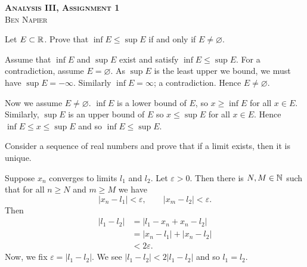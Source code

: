\documentclass[a4paper, answers]{exam}
\begin{document}
\begin{center}
	\textbf{\textsc{Analysis III, Assignment 1}}
	\\
	\textsc{Ben Napier}
	\vspace{1em}
\end{center}
\begin{questions}
	\question
		Let $E \subset \mathbb{R}$.
		Prove that $\inf E \leq \sup E$
		if and only if $E \neq \varnothing$.
		\begin{solution}
			Assume that $\inf E$ and $\sup E$ exist and satisfy 
			$\inf E \leq \sup E$.
			For a contradiction, assume $E = \varnothing$.
			As $\sup E$ is the least upper we bound,
			we must have $\sup E = -\infty$.
			Similarly $\inf E = \infty$; a contradiction.
			Hence $E \neq \varnothing$.

			Now we assume $E \neq \varnothing$.
			$\inf E$ is a lower bound of $E$, so $x \geq \inf E$ for all 
			$x \in E$.
			Similarly, $\sup E$ is an upper bound of $E$ so $x \leq \sup E$
			for all $x \in E$.
			Hence $\inf E \leq x \leq \sup E$
			and so $\inf E \leq \sup E$.
		\end{solution}
	
	\question
		Consider a sequence of real numbers
		and prove that if a limit exists, then it is unique.
		\begin{solution}
			Suppose $x_n$ converges to limits $l_1$ and $l_2$.
			Let $\varepsilon > 0$.
			Then there is $N, M \in \mathbb{N}$
			such that for all $n \geq N$ and $m \geq M$
			we have
			\[
				\left\lvert x_n - l_1 \right\rvert < \varepsilon,
				\qquad \left\lvert x_m - l_2 \right\rvert < \varepsilon.
			\]
			Then
			\begin{align*}
				\left\lvert l_1 - l_2 \right\rvert
				&= \left\lvert l_1 - x_n + x_n - l_2 \right\rvert \\
				&= \left\lvert x_n - l_1 \right\rvert 
					+ \left\lvert x_n - l_2 \right\rvert \\
				&< 2 \varepsilon.
			\end{align*}
			Now, we fix $\varepsilon = \left\lvert l_1 - l_2 \right\rvert$.
			We see 
			$
				\left\lvert l_1 - l_2 \right\rvert 
				< 2 \left\lvert l_1 - l_2 \right\rvert
			$
			and so $l_1 = l_2$.
		\end{solution}


\end{questions}
\end{document}
